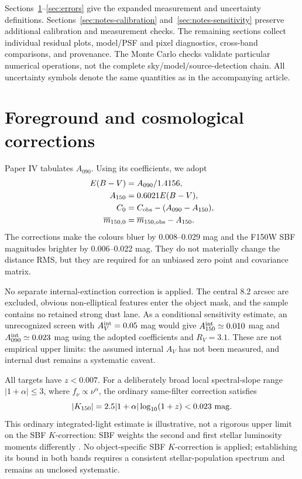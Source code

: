 \documentclass[nodoi,nocopyright]{pas}
\newcommand{\mbar}{\overline{m}}
\begin{document}
Sections~\ref{sec:notes-extinction}--\ref{sec:errors} give the expanded
measurement and uncertainty definitions. Sections~\ref{sec:notes-calibration}
and~\ref{sec:notes-sensitivity} preserve additional calibration and
measurement checks. The remaining sections collect individual residual
plots, model/PSF and pixel diagnostics, cross-band comparisons, and
provenance. The Monte Carlo checks validate particular numerical operations,
not the complete sky/model/source-detection chain. All uncertainty
symbols denote the same quantities as in the accompanying article.

\section{Foreground and cosmological corrections}
\label{sec:notes-extinction}


Paper IV tabulates $A_{090}$. Using its coefficients, we adopt
\begin{align}
 E(B-V)&=A_{090}/1.4156,\\
 A_{150}&=0.6021E(B-V),\\
 C_0&=C_{\rm obs}-(A_{090}-A_{150}),\\
 \mbar_{150,0}&=\mbar_{150,\rm obs}-A_{150}.
\end{align}
The corrections make the colours bluer by 0.008--0.029 mag and the F150W SBF
magnitudes brighter by 0.006--0.022 mag. They do not materially change the
distance RMS, but they are required for an unbiased zero point and covariance
matrix.

No separate internal-extinction correction is applied. The central
$8.2$ arcsec are excluded, obvious non-elliptical features enter the object
mask, and the sample contains no retained strong dust lane. As a conditional
sensitivity estimate, an unrecognized screen with $A_V^{\rm int}=0.05$ mag
would give $A_{150}^{\rm int}\simeq0.010$ mag and
$A_{090}^{\rm int}\simeq0.023$ mag using the adopted coefficients and
$R_V=3.1$. These are not empirical upper limits: the assumed internal
$A_V$ has not been measured, and internal dust remains a systematic caveat.

All targets have $z<0.007$. For a deliberately broad local spectral-slope
range $|1+\alpha|\leq3$, where $f_\nu\propto\nu^\alpha$, the ordinary
same-filter correction satisfies
\begin{equation}
 |K_{150}|=2.5|1+\alpha|\log_{10}(1+z)<0.023~{\rm mag}.
\end{equation}
This ordinary integrated-light estimate is illustrative, not a rigorous
upper limit on the SBF $K$-correction: SBF weights the second and first
stellar luminosity moments differently \citep{Cervino2008}. No object-specific
SBF $K$-correction is applied; establishing its bound in both bands requires
a consistent stellar-population spectrum and remains an unclosed systematic.
\end{document}
